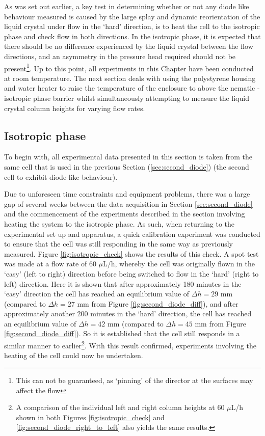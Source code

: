 As was set out earlier, a key test in determining whether or not any diode like behaviour measured is caused by the large splay and dynamic reorientation of the liquid crystal under flow in the `hard' direction, is to heat the cell to the isotropic phase and check flow in both directions. In the isotropic phase, it is expected that there should be no difference experienced by the liquid crystal between the flow directions, and an asymmetry in the pressure head required should not be present\footnote{This can not be guaranteed, as `pinning' of the director at the surfaces may affect the flow}. Up to this point, all experiments in this Chapter have been conducted at room temperature. The next section deals with using the polystyrene housing and water heater to raise the temperature of the enclosure to above the nematic - isotropic phase barrier whilst simultaneously attempting to measure the liquid crystal column heights for varying flow rates.

\subsection{Isotropic phase}
\label{sec:isotropic}

To begin with, all experimental data presented in this section is taken from the same cell that is used in the previous Section (\ref{sec:second_diode}) (the second cell to exhibit diode like behaviour).

Due to unforeseen time constraints and equipment problems, there was a large gap of several weeks between the data acquisition in Section \ref{sec:second_diode} and the commencement of the experiments described in the section involving heating the system to the isotropic phase. As such, when returning to the experimental set up and apparatus, a quick calibration experiment was conducted to ensure that the cell was still responding in the same way as previously measured. Figure \ref{fig:isotropic_check} shows the results of this check. A spot test was made at a flow rate of 60 $\mu$L/h, whereby the cell was originally flown in the `easy' (left to right) direction before being switched to flow in the `hard' (right to left) direction. Here it is shown that after approximately 180 minutes in the `easy' direction the cell has reached an equilibrium value of $\Delta h= 29$ mm (compared to $\Delta h= 27$ mm from Figure \ref{fig:second_diode_diff}), and after approximately another 200 minutes in the `hard' direction, the cell has reached an equilibrium value of $\Delta h= 42$ mm (compared to $\Delta h= 45$ mm from Figure \ref{fig:second_diode_diff}). So it is established that the cell still responds in a similar manner to earlier\footnote{A comparison of the individual left and right column heights at 60 $\mu$L/h shown in both Figures \ref{fig:isotropic_check} and \ref{fig:second_diode_right_to_left} also yields the same results.}. With this result confirmed, experiments involving the heating of the cell could now be undertaken.

